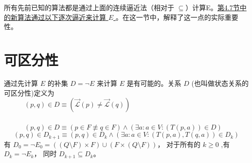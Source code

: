 
所有先前已知的算法都是通过上面的连续逼近法（相对于 $\subseteq$）计算E。\uline{第4.7节中的新算法通过以下逐次逼近来计算 $E$ }。在这一节中，解释了这一点的实际重要性。



\section{可区分性}
通过先计算 $E$ 的补集 $D=\neg E$ 来计算 $E$ 是有可能的。关系 $D$ (也叫做状态关系的可区分性)定义为 \\
\mbox{　　　}$ (p,q) \in D \equiv (\overrightarrow{\mathcal{L}}(p) \not=\overrightarrow{\mathcal{L}}(q)) $\\

 \\
\mbox{　　　}$ (p,q)\in D \equiv (p \in F \not\equiv q \in F) \land (\exists a:a \in V : (T(p,a)) \in D) $\\

$$ (p,q) \in D_{k+1} \equiv (p,q) \in D_k \land ( \exists a:a \in V : (T (p,a),T(q,a))\in D_k)$$
有 $D_0 = \neg E_0 = ( (Q \setminus F) \times F) \cup ( F \times ( Q \setminus F))$， 对于所有的 $k \ge 0$ ,有 $D_k = \neg E_k$， 同时 $D_{k+1} \subseteq D_k $。
\newline


